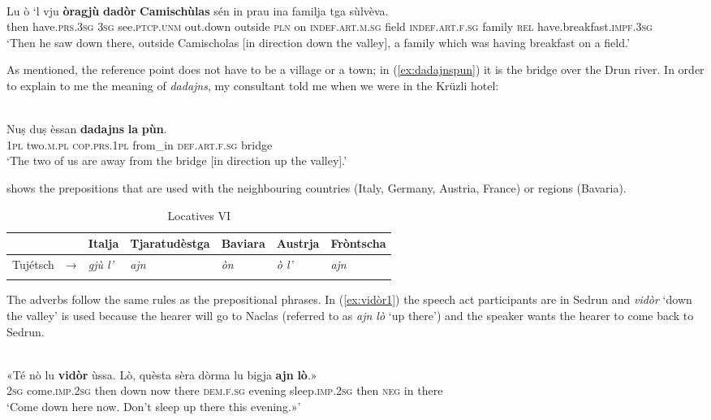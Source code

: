 \ea
\label{}
\\
\gll Lu ò ‘l vju \textbf{òragjù} \textbf{dadòr} \textbf{Camischùlas} sén in prau ina familja tga sùlvèva.\\
then have.\textsc{prs.3sg} \textsc{3sg} see.\textsc{ptcp.unm} out.down outside \textsc{pln} on \textsc{indef.art.m.sg} field \textsc{indef.art.f.sg} family \textsc{rel} have.breakfast.\textsc{impf.3sg}\\
\glt `Then he saw down there, outside Camischolas [in direction down the valley], a family which was having breakfast on a field.'
\z

As mentioned, the reference point does not have to be a village or a town; in (\ref{ex:dadajnspun}) it is the bridge over the Drun river. In order to explain to me the meaning of \textit{dadajns}, my consultant told me when we were in the Krüzli hotel:

\ea
\label{ex:dadajnspun}
\\
\gll Nuṣ duṣ èssan \textbf{dadajns} \textbf{la} \textbf{pùn}.\\
\textsc{1pl} two.\textsc{m.pl} \textsc{cop.prs.1pl} from\_in \textsc{def.art.f.sg} bridge\\
\glt `The two of us are away from the bridge [in direction up the valley].'
\z


 shows the prepositions that are used with the neighbouring countries (Italy, Germany, Austria, France) or regions (Bavaria).

\begin{table}
	\caption{Locatives VI}
	\label{loc6}
	\begin{tabular}{lllllll}
		\lsptoprule
		& & Italja & Tjaratudèstga  & Baviara & Austrja & Fròntscha\\ 
		\midrule
		Tujétsch  &    →& \textit{gjù l'} &  \textit{ajn}   &  \textit{òn} & \textit{ò l'} & \textit{ajn}\\
		\lspbottomrule
	\end{tabular}
\end{table}

The adverbs follow the same rules as the prepositional phrases. In (\ref{ex:vidòr1}) the speech act participants are in Sedrun and \textit{vidòr} `down the valley' is used because the hearer will go to Naclas (referred to as \textit{ajn lò} `up there') and the speaker wants the hearer to come back to Sedrun.

\ea
\label{ex:vidòr1}
\\
\gll «Té nò lu \textbf{vidòr} ùssa. Lò, quèsta sèra dòrma lu bigja \textbf{ajn} \textbf{lò}.»\\
\textsc{2sg} come.\textsc{imp.2sg} then down now there  \textsc{dem.f.sg} evening sleep.\textsc{imp.2sg} then \textsc{neg} in there\\
\glt `Come down here now. Don’t sleep up there this evening.»'
\z

